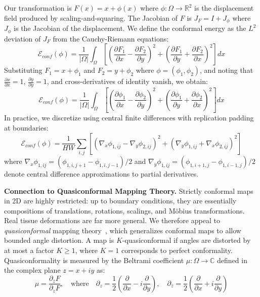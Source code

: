 \documentclass[final,3p,times,review,sort&compress]{elsarticle}
\begin{document}
Our transformation is $F(x) = x + \phi(x)$ where $\phi: \Omega \rightarrow \mathbb{R}^2$ is the displacement field produced by scaling-and-squaring. The Jacobian of $F$ is $J_F = I + J_\phi$ where $J_\phi$ is the Jacobian of the displacement. We define the conformal energy as the $L^2$ deviation of $J_F$ from the Cauchy-Riemann equations:
\begin{equation}
\mathcal{E}_{conf}(\phi) = \frac{1}{|\Omega|} \int_\Omega \left[ \left( \frac{\partial F_1}{\partial x} - \frac{\partial F_2}{\partial y} \right)^2 + \left( \frac{\partial F_1}{\partial y} + \frac{\partial F_2}{\partial x} \right)^2 \right] dx
\label{eq:conformal_energy}
\end{equation}
Substituting $F_1 = x + \phi_1$ and $F_2 = y + \phi_2$ where $\phi = (\phi_1, \phi_2)$, and noting that $\frac{\partial x}{\partial x} = 1$, $\frac{\partial y}{\partial y} = 1$, and cross-derivatives of identity vanish, we obtain:
\begin{equation}
\mathcal{E}_{conf}(\phi) = \frac{1}{|\Omega|} \int_\Omega \left[ \left( \frac{\partial \phi_1}{\partial x} - \frac{\partial \phi_2}{\partial y} \right)^2 + \left( \frac{\partial \phi_1}{\partial y} + \frac{\partial \phi_2}{\partial x} \right)^2 \right] dx
\end{equation}
In practice, we discretize using central finite differences with replication padding at boundaries:
\begin{equation}
\mathcal{E}_{conf}(\phi) = \frac{1}{HW} \sum_{i,j} \left[ \left( \nabla_x \phi_{1,ij} - \nabla_y \phi_{2,ij} \right)^2 + \left( \nabla_y \phi_{1,ij} + \nabla_x \phi_{2,ij} \right)^2 \right]
\end{equation}
where $\nabla_x \phi_{1,ij} = (\phi_{1,i,j+1} - \phi_{1,i,j-1})/2$ and $\nabla_y \phi_{1,ij} = (\phi_{1,i+1,j} - \phi_{1,i-1,j})/2$ denote central difference approximations to partial derivatives.

\textbf{Connection to Quasiconformal Mapping Theory.} Strictly conformal maps in 2D are highly restricted: up to boundary conditions, they are essentially compositions of translations, rotations, scalings, and Möbius transformations. Real tissue deformations are far more general. We therefore appeal to \textit{quasiconformal} mapping theory~\cite{ahlfors2006conformal}, which generalizes conformal maps to allow bounded angle distortion. A map is $K$-quasiconformal if angles are distorted by at most a factor $K \geq 1$, where $K=1$ corresponds to perfect conformality. Quasiconformality is measured by the Beltrami coefficient $\mu: \Omega \rightarrow \mathbb{C}$ defined in the complex plane $z = x + iy$ as:
\begin{equation}
\mu = \frac{\partial_{\bar{z}} F}{\partial_z F}, \quad \text{where} \quad \partial_z = \frac{1}{2}\left( \frac{\partial}{\partial x} - i \frac{\partial}{\partial y} \right), \quad \partial_{\bar{z}} = \frac{1}{2}\left( \frac{\partial}{\partial x} + i \frac{\partial}{\partial y} \right)
\end{equation}
\end{document}

